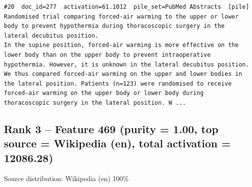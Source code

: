 \begin{verbatim}
#20  doc_id=277  activation=61.1012  pile_set=PubMed Abstracts  [pile]
Randomised trial comparing forced-air warming to the upper or lower body to prevent hypothermia during thoracoscopic surgery in the lateral decubitus position.
In the supine position, forced-air warming is more effective on the lower body than on the upper body to prevent intraoperative hypothermia. However, it is unknown in the lateral decubitus position. We thus compared forced-air warming on the upper and lower bodies in the lateral position. Patients (n=123) were randomised to receive forced-air warming on the upper body or lower body during thoracoscopic surgery in the lateral position. W ...

\end{verbatim}

\subsection*{Rank 3 -- Feature 469 (purity = 1.00, top source = Wikipedia (en), total activation = 12086.28)}

Source distribution: Wikipedia (en) 100\%

